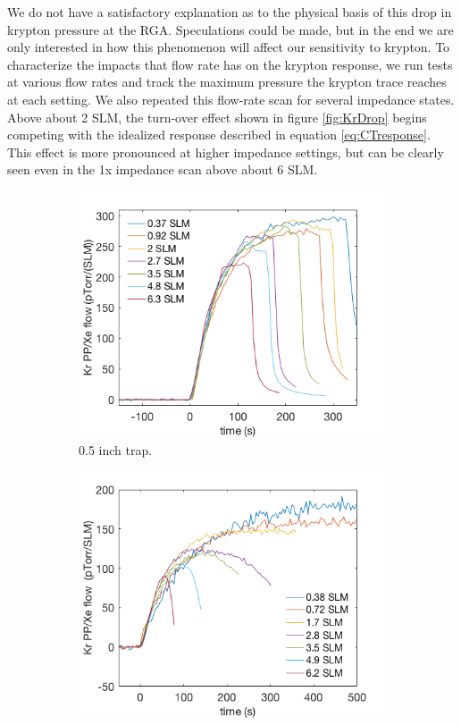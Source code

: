 We do not have a satisfactory explanation as to the physical basis of this drop in krypton pressure at the RGA. Speculations could be made, but in the end we are only interested in how this phenomenon will affect our sensitivity to krypton. To characterize the impacts that flow rate has on the krypton response, we run tests at various flow rates and track the maximum pressure the krypton trace reaches at each setting. We also repeated this flow-rate scan for several impedance states. Above about 2 SLM, the turn-over effect shown in figure \ref{fig:KrDrop} begins competing with the idealized response described in equation \ref{eq:CTresponse}. This effect is more pronounced at higher impedance settings, but can be clearly seen even in the 1x impedance scan above about 6 SLM.
\begin{figure}[h!]
\centering
\begin{subfigure}{0.5\textwidth}
  \centering
  \includegraphics[width=\textwidth]{Figures/SLAC_FlowResponse_15x.png}
  \caption{0.5 inch trap.}
  \label{fig:flow_traces_0p5}
\end{subfigure}%
\begin{subfigure}{0.5\textwidth}
  \centering
  \includegraphics[width=\textwidth]{Figures/SLAC_FlowResponse_15x_1p5in.png}

\end{subfigure}
\end{figure}
